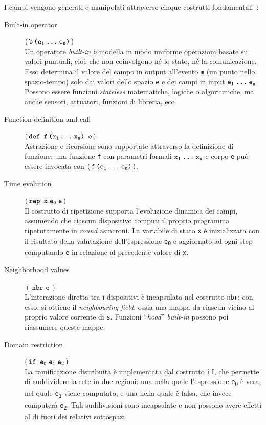 I campi vengono generati e manipolati attraverso cinque costrutti fondamentali~\cite{tocl}:

\begin{description}

  \item[Built-in operator] \((\,\texttt{b\,(e\textsubscript{1}\:\dots{}\:e\textsubscript{n})}\,)\) \\
    Un operatore \emph{built-in} \texttt{b} modella in modo uniforme operazioni basate su valori puntuali, cioè che non coinvolgono né lo stato, né la comunicazione.
    Esso determina il valore del campo in output all'evento \texttt{m} (un punto nello spazio-tempo) solo dai valori dello spazio \texttt{e}
    e dei campi in input \(\texttt{e\textsubscript{1}\:\dots{}\:e\textsubscript{n}}\).
    Possono essere funzioni \emph{stateless} matematiche, logiche o algoritmiche, ma anche sensori, attuatori, funzioni di libreria, ecc.

  \item[Function definition and call] \((\,\texttt{def\ f\,(x\textsubscript{1}\:\dots{}\:x\textsubscript{n})\ e}\,)\) \\
    Astrazione e ricorsione sono supportate attraverso la definizione di funzione:
    una funzione \texttt{f} con parametri formali \(\texttt{x\textsubscript{1}\:\dots{}\:x\textsubscript{n}}\) e corpo \texttt{e}
    può essere invocata con \((\,\texttt{f\,(e\textsubscript{1}\:\dots{}\:e\textsubscript{n})}\,)\).

  \item[Time evolution] \((\,\texttt{rep\ x\;e\textsubscript{0}\;e}\,)\) \\
    Il costrutto di ripetizione supporta l'evoluzione dinamica dei campi, assumendo che ciascun dispositivo computi il proprio programma ripetutamente in \emph{round} asincroni.
    La variabile di stato \texttt{x} è inizializzata con il risultato della valutazione dell'espressione \texttt{e\textsubscript{0}} e aggiornato ad ogni step computando \texttt{e} in relazione al precedente valore di \texttt{x}.

  \item[Neighborhood values] \((\,\texttt{nbr\ e}\,)\) \\
    L'interazione diretta tra i dispositivi è incapsulata nel costrutto \texttt{nbr};
    con esso, si ottiene il \emph{neighbouring field}, ossia una mappa da ciascun vicino al proprio valore corrente di \texttt{s}.
    Funzioni ``\emph{hood}'' \emph{built-in} possono poi riassumere queste mappe.

  \item[Domain restriction] \((\,\texttt{if\ e\textsubscript{0}\;e\textsubscript{1}\;e\textsubscript{2}}\,)\) \\
    La ramificazione distribuita è implementata dal costrutto \texttt{if}, che permette di suddividere la rete in due regioni:
    una nella quale l'espressione \texttt{e\textsubscript{0}} è vera, nel quale \texttt{e\textsubscript{1}} viene computato, e una nella quale è falsa, che invece computerà \texttt{e\textsubscript{2}}.
    Tali suddivisioni sono incapsulate e non possono avere effetti al di fuori dei relativi sottospazi.
\end{description}

